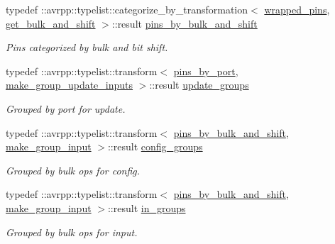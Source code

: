 \begin{DoxyCompactItemize}
typedef ::avrpp::typelist::categorize\_\-by\_\-transformation$<$ \hyperlink{structavrpp_1_1bus_1_1input__bus_a3b24c1489f5178105f4edbe7db7d3e89}{wrapped\_\-pins}, \hyperlink{structavrpp_1_1bus_1_1get__bulk__and__shift}{get\_\-bulk\_\-and\_\-shift} $>$::result \hyperlink{structavrpp_1_1bus_1_1input__bus_a3629efb5413d267c3a8ce7d5391b2c2c}{pins\_\-by\_\-bulk\_\-and\_\-shift}
\begin{DoxyCompactList}\small\item\em Pins categorized by bulk and bit shift. \item\end{DoxyCompactList}\item 
typedef ::avrpp::typelist::transform$<$ \hyperlink{structavrpp_1_1bus_1_1input__bus_a991bf34f4a8c2228bcc1f10223b2f985}{pins\_\-by\_\-port}, \hyperlink{structavrpp_1_1bus_1_1input__bus_1_1make__group__update__inputs}{make\_\-group\_\-update\_\-inputs} $>$::result \hyperlink{structavrpp_1_1bus_1_1input__bus_ab516c7ff6d9e97584d886caa09dff68d}{update\_\-groups}
\begin{DoxyCompactList}\small\item\em Grouped by port for update. \item\end{DoxyCompactList}\item 
typedef ::avrpp::typelist::transform$<$ \hyperlink{structavrpp_1_1bus_1_1input__bus_a3629efb5413d267c3a8ce7d5391b2c2c}{pins\_\-by\_\-bulk\_\-and\_\-shift}, \hyperlink{structavrpp_1_1bus_1_1input__bus_1_1make__group__input}{make\_\-group\_\-input} $>$::result \hyperlink{structavrpp_1_1bus_1_1input__bus_a8187a3f01eb0585590a71c07806d6f2d}{config\_\-groups}
\begin{DoxyCompactList}\small\item\em Grouped by bulk ops for config. \item\end{DoxyCompactList}\item 
typedef ::avrpp::typelist::transform$<$ \hyperlink{structavrpp_1_1bus_1_1input__bus_a3629efb5413d267c3a8ce7d5391b2c2c}{pins\_\-by\_\-bulk\_\-and\_\-shift}, \hyperlink{structavrpp_1_1bus_1_1input__bus_1_1make__group__input}{make\_\-group\_\-input} $>$::result \hyperlink{structavrpp_1_1bus_1_1input__bus_a5615071616dcadcc6d365c8b8354f537}{in\_\-groups}
\begin{DoxyCompactList}\small\item\em Grouped by bulk ops for input. \item\end{DoxyCompactList}\item 

\end{DoxyCompactItemize}
